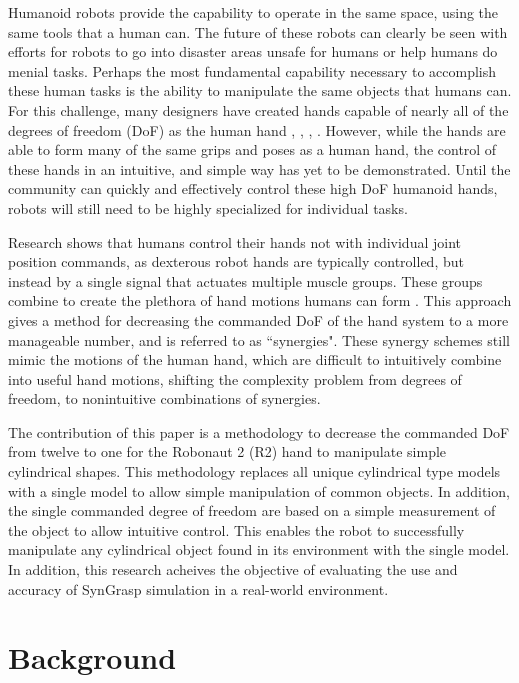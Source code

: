 \documentclass[runningheads,a4paper]{llncs}
\begin{document}
Humanoid robots provide the capability to operate in the same space, using the same tools that a human can. The future of these robots can clearly be seen with efforts for robots to go into disaster areas unsafe for humans \cite{fukushima_robots} or help humans do menial tasks. Perhaps the most fundamental capability necessary to accomplish these human tasks is the ability to manipulate the same objects that humans can. For this challenge, many designers have created hands capable of nearly all of the degrees of freedom (DoF) as the human hand \cite{r2_hand}, \cite{DRL}, \cite{hrp3}, \cite{softhand}. However, while the hands are able to form many of the same grips and poses as a human hand, the control of these hands in an intuitive, and simple way has yet to be demonstrated. Until the community can quickly and effectively control these high DoF humanoid hands, robots will still need to be highly specialized for individual tasks. \par
Research shows that humans control their hands not with individual joint position commands, as dexterous robot hands are typically controlled, but instead by a single signal that actuates multiple muscle groups. These groups combine to create the plethora of hand motions humans can form \cite{Santello} \cite{neuro}. This approach gives a method for decreasing the commanded DoF of the hand system to a more manageable number, and is referred to as ``synergies". These synergy schemes still mimic the motions of the human hand, which are difficult to intuitively combine into useful hand motions, shifting the complexity problem from degrees of freedom, to nonintuitive combinations of synergies. \par
The contribution of this paper is a methodology to decrease the commanded DoF from twelve to one for the Robonaut 2 (R2) hand to manipulate simple cylindrical shapes. This methodology replaces all unique cylindrical type models with a single model to allow simple manipulation of common objects. In addition, the single commanded degree of freedom are based on a simple measurement of the object to allow intuitive control. This enables the robot to successfully manipulate any cylindrical object found in its environment with the single model. In addition, this research acheives the objective of evaluating the use and accuracy of SynGrasp simulation in a real-world environment.

\section{Background}
\end{document}
